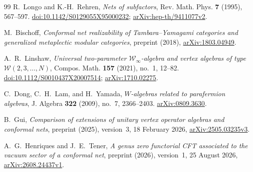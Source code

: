 \begin{thebibliography}{99}
R.~Longo and K.-H.~Rehren,
\emph{Nets of subfactors},
Rev. Math. Phys. \textbf{7} (1995), 567--597.
\href{https://doi.org/10.1142/S0129055X95000232}{doi:10.1142/S0129055X95000232};
\href{https://arxiv.org/abs/hep-th/9411077v2}{arXiv:hep-th/9411077v2}.

M.~Bischoff,
\emph{Conformal net realizability of Tambara--Yamagami categories
and generalized metaplectic modular categories},
preprint (2018),
\href{https://arxiv.org/abs/1803.04949}{arXiv:1803.04949}.

A.~R.~Linshaw,
\emph{Universal two-parameter $\mathcal W_\infty$-algebra and vertex
algebras of type $\mathcal W(2,3,\ldots,N)$},
Compos. Math. \textbf{157} (2021), no.~1, 12--82.
\href{https://doi.org/10.1112/S0010437X20007514}{doi:10.1112/S0010437X20007514};
\href{https://arxiv.org/abs/1710.02275}{arXiv:1710.02275}.

C.~Dong, C.~H.~Lam, and H.~Yamada,
\emph{$W$-algebras related to parafermion algebras},
J. Algebra \textbf{322} (2009), no.~7, 2366--2403.
\href{https://arxiv.org/abs/0809.3630}{arXiv:0809.3630}.

B.~Gui,
\emph{Comparison of extensions of unitary vertex operator algebras
and conformal nets},
preprint (2025), version~3, 18 February 2026,
\href{https://arxiv.org/abs/2505.03235v3}{arXiv:2505.03235v3}.

A.~G.~Henriques and J.~E.~Tener,
\emph{A genus zero functorial CFT associated to the vacuum sector
of a conformal net},
preprint (2026), version~1, 25 August 2026,
\href{https://arxiv.org/abs/2608.24437v1}{arXiv:2608.24437v1}.

\end{thebibliography}
